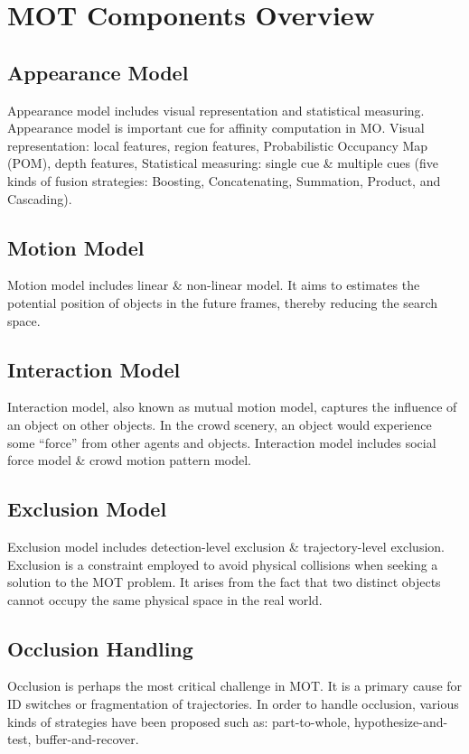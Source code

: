 \section{MOT Components Overview}
    \subsection{Appearance Model}
        Appearance model includes visual representation and statistical measuring. Appearance model is important cue for affinity computation in MO. Visual representation: local features, region features, 
        Probabilistic Occupancy Map (POM), depth features, Statistical measuring: single cue \& multiple cues (five kinds of fusion strategies: Boosting, Concatenating, Summation, Product, and Cascading).
    \subsection{Motion Model}
        Motion model includes linear \& non-linear model. It aims to estimates the potential position of objects in the future frames, thereby reducing the search space.
    \subsection{Interaction Model} 
        Interaction model, also known as mutual motion model, captures the influence of an object on other objects. In the crowd scenery, an object would experience some “force” from other agents and objects. 
        Interaction model includes social force model \& crowd motion pattern model.
    \subsection{Exclusion Model}
        Exclusion model includes detection-level exclusion \& trajectory-level exclusion. Exclusion is a constraint employed to avoid physical collisions when seeking a solution to the MOT problem. It arises from 
        the fact that two distinct objects cannot occupy the same physical space in the real world.
    \subsection{Occlusion Handling}
        Occlusion is perhaps the most critical challenge in MOT. It is a primary cause for ID switches or fragmentation of trajectories. In order to handle occlusion, various kinds of strategies have been proposed such as: 
        part-to-whole, hypothesize-and-test, buffer-and-recover.
    

